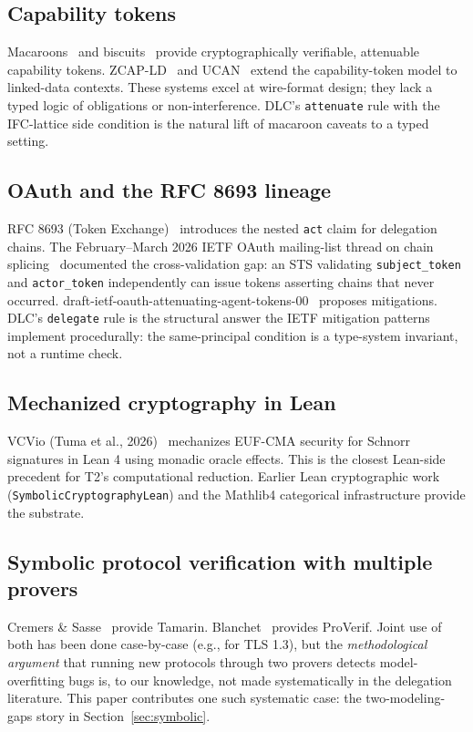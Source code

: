 \subsection{Capability tokens}

Macaroons~\cite{birgisson2014macaroons} and
biscuits~\cite{couprie2022biscuits} provide cryptographically
verifiable, attenuable capability tokens.  ZCAP-LD~\cite{w3c2021zcap}
and UCAN~\cite{ucan2024} extend the capability-token model to
linked-data contexts.  These systems excel at wire-format design;
they lack a typed logic of obligations or non-interference.  DLC's
\texttt{attenuate} rule with the IFC-lattice side condition is the
natural lift of macaroon caveats to a typed setting.

\subsection{OAuth and the RFC 8693 lineage}

RFC 8693 (Token Exchange)~\cite{rfc8693} introduces the nested
\texttt{act} claim for delegation chains.  The February--March 2026 IETF
OAuth mailing-list thread on chain splicing~\cite{ietf2026splicing}
documented the cross-validation gap: an STS validating
\texttt{subject\_token} and \texttt{actor\_token} independently can
issue tokens asserting chains that never occurred.
draft-ietf-oauth-attenuating-agent-tokens-00~\cite{niyikiza2026attn}
proposes mitigations.  DLC's \texttt{delegate} rule is the
structural answer the IETF mitigation patterns implement procedurally:
the same-principal condition is a type-system invariant, not a
runtime check.

\subsection{Mechanized cryptography in Lean}

VCVio (Tuma et al.,
2026)~\cite{tuma2026vcvio} mechanizes EUF-CMA security for Schnorr
signatures in Lean 4 using monadic oracle effects.  This is the
closest Lean-side precedent for T2's computational reduction.  Earlier
Lean cryptographic work (\texttt{SymbolicCryptographyLean}) and
the Mathlib4 categorical infrastructure provide the substrate.

\subsection{Symbolic protocol verification with multiple provers}

Cremers \& Sasse~\cite{cremers2013tamarin} provide Tamarin.
Blanchet~\cite{blanchet2022proverif} provides ProVerif.  Joint use
of both has been done case-by-case (e.g., for TLS 1.3), but the
\emph{methodological argument} that running new protocols through
two provers detects model-overfitting bugs is, to our knowledge, not
made systematically in the delegation literature.  This paper
contributes one such systematic case: the two-modeling-gaps story
in Section~\ref{sec:symbolic}.
